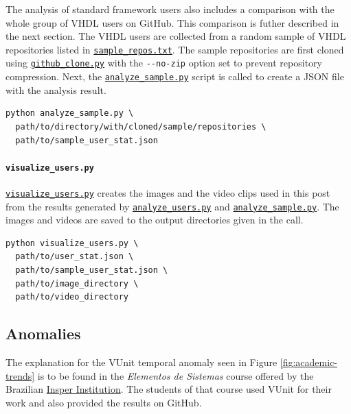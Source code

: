 \documentclass[]{article}
\let\oldparagraph\paragraph
\renewcommand{\paragraph}[1]{\oldparagraph{#1}\mbox{}}
\begin{document}
The analysis of standard framework users also includes a comparison with the whole group of VHDL users on GitHub. This comparison is futher described in the next section. The VHDL users are collected from a random sample of VHDL repositories listed in \href{https://github.com/LarsAsplund/github-facts/tree/main/sample_repos.txt}{\texttt{sample\_repos.txt}}. The sample repositories are first cloned using \href{https://github.com/LarsAsplund/github-facts/tree/main/py/github_clone.py}{\texttt{github\_clone.py}} with the \texttt{-\/-no-zip} option set to prevent repository compression. Next, the \href{https://github.com/LarsAsplund/github-facts/tree/main/py/analyze_sample.py}{\texttt{analyze\_sample.py}} script is called to create a JSON file with the analysis result.

\begin{verbatim}
python analyze_sample.py \
  path/to/directory/with/cloned/sample/repositories \
  path/to/sample_user_stat.json
\end{verbatim}

\hypertarget{visualize-users}{%
\paragraph{\texorpdfstring{\texttt{visualize\_users.py}}{visualize\_users.py}}\label{visualize-users}}

\href{https://github.com/LarsAsplund/github-facts/tree/main/py/visualize_users.py}{\texttt{visualize\_users.py}} creates the images and the video clips used in this post from the results generated by \href{https://github.com/LarsAsplund/github-facts/tree/main/py/analyze_users.py}{\texttt{analyze\_users.py}} and \href{https://github.com/LarsAsplund/github-facts/tree/main/py/analyze_sample.py}{\texttt{analyze\_sample.py}}. The images and videos are saved to the output directories given in the call.

\begin{verbatim}
python visualize_users.py \
  path/to/user_stat.json \
  path/to/sample_user_stat.json \
  path/to/image_directory \
  path/to/video_directory
\end{verbatim}

\hypertarget{anomalies}{%
\subsection{Anomalies}\label{anomalies}}

The explanation for the VUnit temporal anomaly seen in Figure \ref{fig:academic-trends} is to be found in the \emph{Elementos de Sistemas} course offered by the Brazilian \href{https://www.insper.edu.br/}{Insper Institution}. The students of that course used VUnit for their work and also provided the results on GitHub.
\end{document}
